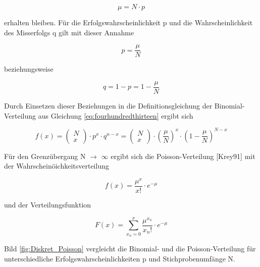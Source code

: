 \begin{equation}\label{eq:fourhundredfourtyfour}
\mu =N\cdot p
\end{equation}

\noindent erhalten bleiben. F\"{u}r die Erfolgswahrscheinlichkeit p und die Wahrscheinlichkeit des Misserfolgs q gilt mit dieser Annahme

\begin{equation}\label{eq:fourhundredfourtyfive}
p=\dfrac{\mu}{N}
\end{equation}

\noindent beziehungsweise

\begin{equation}\label{eq:fourhundredfourtysix}
q=1-p=1-\dfrac{\mu}{N}
\end{equation}

\noindent Durch Einsetzen dieser Beziehungen in die Definitionsgleichung der Binomial-Verteilung aus Gleichung \eqref{eq:fourhundredthirteen} ergibt sich 

\begin{equation}\label{eq:fourhundredfourtyseven}
f\left(x\right)=\left(\begin{array}{l} {N} \\
{x} \end{array}\right)\cdot p^{x} \cdot q^{n-x} =\left(\begin{array}{l} {N} \\
{x} \end{array}\right)\cdot \left(\dfrac{\mu }{N} \right)^{x} \cdot \left(1-\dfrac{\mu }{N} \right)^{N-x}
\end{equation}

\noindent F\"{u}r den Grenz\"{u}bergang N $\rightarrow$ $\infty$ ergibt sich die Poisson-Verteilung [Krey91] mit der Wahrschein\"{o}ichkeitsverteilung

\begin{equation}\label{eq:fourhundredfourtyeight}
f(x)=\dfrac{\mu ^{x}}{x!} \cdot e^{-\mu}
\end{equation}

\noindent und der Verteilungsfunktion

\begin{equation}\label{eq:fourhundredfourtynine}
F(x)=\sum _{x_{n} =0}^{x}\dfrac{\mu ^{x_{n}}}{x_{n} !} \cdot e^{-\mu}
\end{equation}

\noindent Bild \ref{fig:Diskret_Poisson} vergleicht die Binomial- und die Poisson-Verteilung f\"{u}r unterschiedliche Erfolgswahrscheinlichkeiten p und Stichprobenumf\"{a}nge N.


